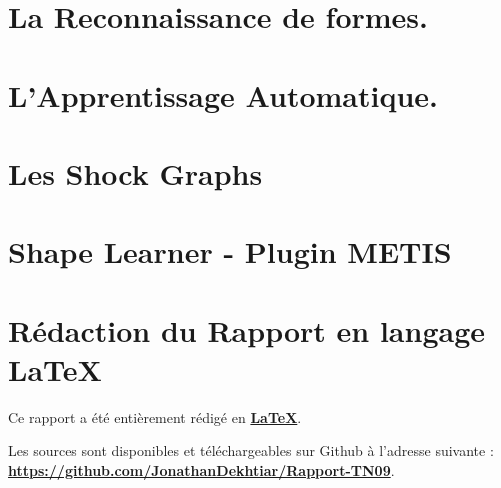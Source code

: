 \documentclass[12pt,a4paper,utf8x, combine]{report}
\begin{document}



\tableofcontents
\listoffigures
\clearpage










\chapter{La Reconnaissance de formes.}


\chapter{L'Apprentissage Automatique.}


\clearpage

\chapter{Les Shock Graphs}

\clearpage

\chapter{Shape Learner - Plugin METIS}





\clearpage




\nocite{*}



\printindex

\appendix

\pagebreak

\chapter*{Rédaction du Rapport en langage LaTeX}
Ce rapport a été entièrement rédigé en \href{http://fr.wikipedia.org/wiki/LaTeX}{\textbf{LaTeX}}. 

Les sources sont disponibles et téléchargeables sur Github à l'adresse suivante :\\
\href{https://github.com/JonathanDekhtiar/Rapport-TN09}{\textbf{https://github.com/JonathanDekhtiar/Rapport-TN09}}. 
\end{document}
